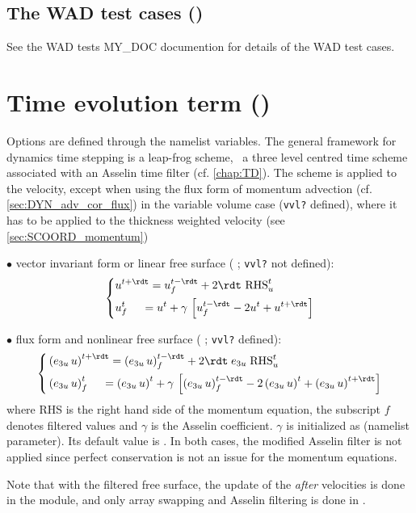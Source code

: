 \documentclass[../main/NEMO_manual]{subfiles}
\begin{document}
\subsection[The WAD test cases (\textit{usrdef\_zgr.F90})]{The WAD test cases ()}
\label{subsec:DYN_WAD_test_cases}

See the WAD tests MY\_DOC documention for details of the WAD test cases.

\section[Time evolution term (\textit{dynnxt.F90})]{Time evolution term (\protect{})}
\label{sec:DYN_nxt}

Options are defined through the  namelist variables.
The general framework for dynamics time stepping is a leap-frog scheme,
\ie\ a three level centred time scheme associated with an Asselin time filter (cf. \autoref{chap:TD}).
The scheme is applied to the velocity, except when
using the flux form of momentum advection (cf. \autoref{sec:DYN_adv_cor_flux})
in the variable volume case (\texttt{vvl?} defined),
where it has to be applied to the thickness weighted velocity (see \autoref{sec:SCOORD_momentum})

$\bullet$ vector invariant form or linear free surface
( ; \texttt{vvl?} not defined):
\[
  \left\{
    \begin{aligned}
      &u^{t+\rdt} = u_f^{t-\rdt} + 2\rdt  \ \text{RHS}_u^t  	\\
      &u_f^t \;\quad = u^t+\gamma \,\left[ {u_f^{t-\rdt} -2u^t+u^{t+\rdt}} \right]
    \end{aligned}
  \right.
\]

$\bullet$ flux form and nonlinear free surface
( ; \texttt{vvl?} defined):
\[
  \left\{
    \begin{aligned}
      &\left(e_{3u}\,u\right)^{t+\rdt} = \left(e_{3u}\,u\right)_f^{t-\rdt} + 2\rdt \; e_{3u} \;\text{RHS}_u^t  	\\
      &\left(e_{3u}\,u\right)_f^t \;\quad = \left(e_{3u}\,u\right)^t
      +\gamma \,\left[ {\left(e_{3u}\,u\right)_f^{t-\rdt} -2\left(e_{3u}\,u\right)^t+\left(e_{3u}\,u\right)^{t+\rdt}} \right]
    \end{aligned}
  \right.
\]
where RHS is the right hand side of the momentum equation,
the subscript $f$ denotes filtered values and $\gamma$ is the Asselin coefficient.
$\gamma$ is initialized as  (namelist parameter).
Its default value is .
In both cases, the modified Asselin filter is not applied since perfect conservation is not an issue for
the momentum equations.

Note that with the filtered free surface,
the update of the \textit{after} velocities is done in the  module,
and only array swapping and Asselin filtering is done in .

\subinc{}
\end{document}
